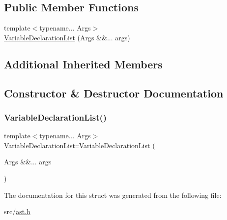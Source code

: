 \subsection*{Public Member Functions}
\begin{DoxyCompactItemize}
\item 
{\footnotesize template$<$typename... Args$>$ }\\\hyperlink{struct_variable_declaration_list_a79cab6a85e69303e75972f77c1c64eee}{Variable\+Declaration\+List} (Args \&\&... args)
\end{DoxyCompactItemize}
\subsection*{Additional Inherited Members}


\subsection{Constructor \& Destructor Documentation}
\mbox{\label{struct_variable_declaration_list_a79cab6a85e69303e75972f77c1c64eee}} 
\subsubsection{\texorpdfstring{Variable\+Declaration\+List()}{VariableDeclarationList()}}
{\footnotesize\ttfamily template$<$typename... Args$>$ \\
Variable\+Declaration\+List\+::\+Variable\+Declaration\+List (\begin{DoxyParamCaption}\item[{Args \&\&...}]{args }\end{DoxyParamCaption})\hspace{0.3cm}{\ttfamily [inline]}}



The documentation for this struct was generated from the following file\+:\begin{DoxyCompactItemize}
\item 
src/\hyperlink{ast_8h}{ast.\+h}\end{DoxyCompactItemize}
